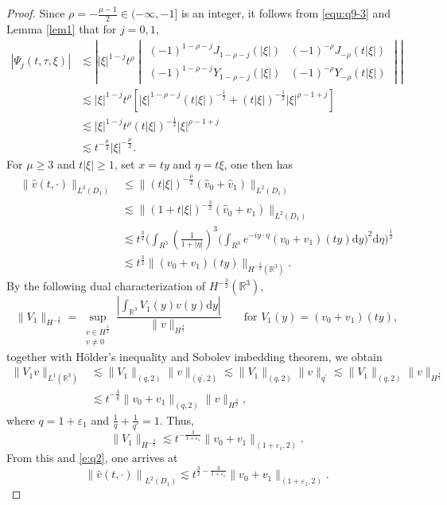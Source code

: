 \documentclass[10pt,a4paper]{amsart}
\newcommand{\R}{\mathbb R}
\newcommand{\f}{\frac}
\begin{document}
\begin{proof}
Since $\rho=-\f{\mu-1}{2}\in(-\infty, -1]$ is an integer, it follows from \eqref{equ:q9-3} and Lemma \ref{lem1} that for $j=0,1$,
\begin{equation}\label{e:q1}
\begin{aligned}
|\Psi_j(t,\tau,\xi)|
&\lesssim\left| |\xi|^{1-j} t^{\rho}
\begin{vmatrix}
(-1)^{1-\rho-j}J_{1-\rho-j}(|\xi|) & (-1)^{-\rho}J_{-\rho}(t|\xi|) \\
(-1)^{1-\rho-j}Y_{1-\rho-j}(|\xi|) & (-1)^{-\rho}Y_{-\rho}(t|\xi|)
\end{vmatrix} \right|\\
&\lesssim |\xi|^{1-j} t^{\rho}\left[|\xi|^{1-\rho-j}(t|\xi|)^{-\f12}+(t|\xi|)^{-\f12}|\xi|^{\rho-1+j}\right]\\
&\lesssim |\xi|^{1-j} t^{\rho}(t|\xi|)^{-\f12}|\xi|^{\rho-1+j}\\
&\lesssim t^{-\f{\mu}{2}}|\xi|^{-\f{\mu}{2}}.
\end{aligned}
\end{equation}
For $\mu\geq3$ and $t|\xi|\geq 1$, set
$x=ty$ and $\eta=t\xi$, one then has
\begin{equation}\label{e:q2}
\begin{aligned}
\big\|\hat{v}(t, \cdot)\big\|_{L^2(D_1)} & \leq\big\|(t|\xi|)^{-\f{\mu}{2}}(\hat{v}_{0}+\hat{v}_{1})\big\|_{L^{2}(D_1)} \\& \lesssim\big\|(1+t|\xi|)^{-\f32}(\hat{v}_{0}+\hat{v}_{1})\big\|_{L^{2}(D_1)} \\
& \lesssim t^{\f32}\big(\int_{R^3} (\frac{1}{1+|\eta|})^3\big(\int_{R^3} e^{-i y \cdot \eta} (v_0+v_1)(ty) \mathrm{d} y\big)^2 \mathrm{d} \eta\big)^{\frac{1}{2}}\\
& \lesssim t^{\f32}\|(v_0+v_1)(ty)\|_{H^{-\f32}(\R^3)}.
\end{aligned}
\end{equation}
By the following dual characterization of $H^{-\f32}(\R^3)$, $$\|V_1\|_{H^{-\f32}}=\sup _{\substack{v \in H^\f32 \\ v \neq 0}} \frac{\left|\int_{\mathbb{R}^3} V_1(y) v(y) \mathrm{d} y\right|}{\|v\|_{H^{\f32}}}\qquad \text{for}\,\, V_1(y)=(v_0+v_1)(ty),$$
together with H\"{o}lder's inequality and Sobolev imbedding theorem, we obtain
\begin{equation}\label{e:q3}
\begin{aligned}
\|V_1 v\|_{L^1(\R^3)} &\lesssim\|V_1\|_{(q, 2)}\|v\|_{\left(q^{\prime}, 2\right)} \lesssim\|V_1\|_{(q, 2)}\|v\|_{q^{\prime}} \lesssim\|V_1\|_{(q, 2)}\|v\|_{H^{\f32}}\\
&\lesssim t^{-\f{3}{q}}\|v_0+v_1\|_{(q, 2)}\|v\|_{H^{\f32}},
\end{aligned}
\end{equation}
where $q=1+\varepsilon_1$  and $\f{1}{q}+\f{1}{q'}=1$. Thus,
$$
\|V_1\|_{H^{-\f32}}\lesssim t^{-\f{3}{1+\varepsilon_1}}\|v_0+v_1\|_{(1+\varepsilon_1, 2)}.
$$
From this and \eqref{e:q2}, one arrives at
\begin{equation}\label{e:q4}
\left\|\hat{v}(t, \cdot)\right\|_{L^2(D_1)}\lesssim t^{\f32-\f{3}{1+\varepsilon_1}}\|v_0+v_1\|_{(1+\varepsilon_1, 2)}.
\end{equation}


\end{proof}
\end{document}
